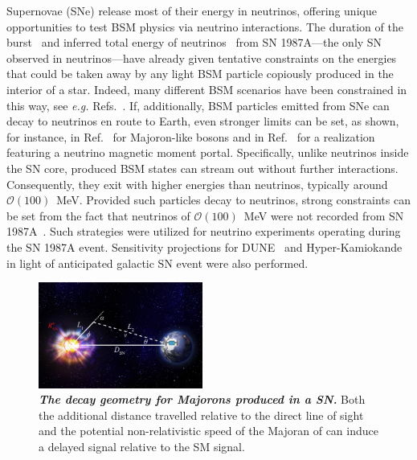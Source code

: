 \documentclass[aps,twocolumn,prl,showpacs,showkeys,preprintnumbers,superscriptaddress,nobibnotes,floatfix,longbibliography,notitlepage,nofootinbib]{revtex4-2}
\begin{document}
Supernovae (SNe) release most of their energy in neutrinos, offering unique opportunities to test BSM physics via neutrino interactions.
The duration of the burst~\cite{Kamiokande-II:1987idp,Bionta:1987qt,Baksan} and inferred total energy of neutrinos~\cite{Loredo:2001rx,Pagliaroli:2008ur,Huedepohl2010} from SN 1987A---the only SN observed in neutrinos---have already given tentative constraints on the energies that could be taken away by any light BSM particle copiously produced in the interior of a star.
Indeed, many different BSM scenarios have been constrained in this way, see \textit{e.g.} Refs.~\cite{Raffelt:2011nc,Arguelles:2016uwb,Suliga:2020vpz,Lucente:2021hbp,Caputo:2022rca,Caputo:2021rux,PhysRevD.100.083002,DeRocco:2019njg,Kazanas:2014mca,Magill:2018jla}. If, additionally, BSM particles emitted from SNe can decay to neutrinos en route to Earth, even stronger limits can be set, as shown, for instance, in Ref.~\cite{Fiorillo:2022cdq} for Majoron-like bosons and in Ref.~\cite{Brdar:2023tmi} for a realization featuring a neutrino magnetic moment portal.
Specifically, unlike neutrinos inside the SN core, produced BSM states can stream out without further interactions.
Consequently, they exit with higher energies than neutrinos, typically around $\mathcal{O}(100)$~MeV.
Provided such particles decay to neutrinos, strong constraints can be set from the fact that neutrinos of $\mathcal{O}(100)$~MeV were not recorded from SN 1987A~\cite{Fiorillo:2022cdq, Brdar:2023tmi}.
Such strategies were utilized for neutrino experiments operating during the SN 1987A event. Sensitivity projections for  DUNE~\cite{DUNE:2015lol} and Hyper-Kamiokande~\cite{Hyper-Kamiokande:2018ofw} in light of anticipated galactic SN event were also performed. 

\begin{figure}[t!]
\vspace{0.27cm}
    \centering
    \includegraphics[width=0.48\textwidth]{figures/Supernova_Diagram}
    \caption{\textit{\textbf{The decay geometry for Majorons produced in a SN.}}
    Both the additional distance travelled relative to the direct line of sight and the potential non-relativistic speed of the Majoran of can induce a delayed signal relative to the SM signal.
    }
    \label{fig:geometry}
\end{figure}
\end{document}
